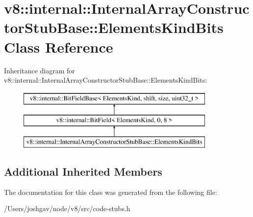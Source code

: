\hypertarget{classv8_1_1internal_1_1_internal_array_constructor_stub_base_1_1_elements_kind_bits}{}\section{v8\+:\+:internal\+:\+:Internal\+Array\+Constructor\+Stub\+Base\+:\+:Elements\+Kind\+Bits Class Reference}
\label{classv8_1_1internal_1_1_internal_array_constructor_stub_base_1_1_elements_kind_bits}
Inheritance diagram for v8\+:\+:internal\+:\+:Internal\+Array\+Constructor\+Stub\+Base\+:\+:Elements\+Kind\+Bits\+:\begin{figure}[H]
\begin{center}
\leavevmode
\includegraphics[height=3.000000cm]{classv8_1_1internal_1_1_internal_array_constructor_stub_base_1_1_elements_kind_bits}
\end{center}
\end{figure}
\subsection*{Additional Inherited Members}


The documentation for this class was generated from the following file\+:\begin{DoxyCompactItemize}
\item 
/\+Users/joshgav/node/v8/src/code-\/stubs.\+h\end{DoxyCompactItemize}
